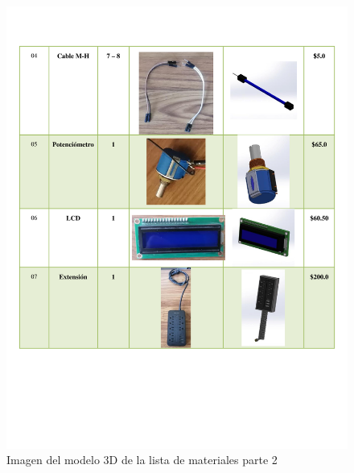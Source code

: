 \begin{itemize}
    
    \begin{figure}[H]
        \centering
        \includegraphics[trim = {0mm 1mm 1mm 1mm},clip,scale=0.5]{19/Img/listaDeMateriales 2.pdf}
        \caption{Imagen del modelo 3D de la lista de materiales parte 2}
        \label{fig:lista2}
    \end{figure}
    

\end{itemize}
